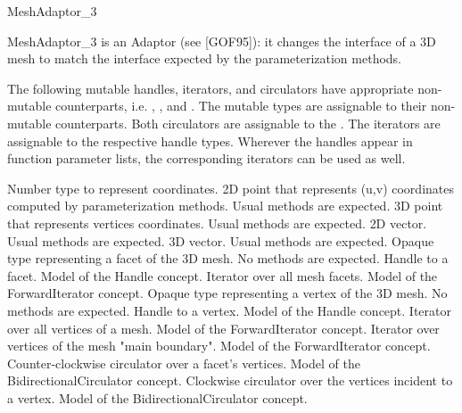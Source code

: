 \begin{ccRefConcept}{MeshAdaptor_3}

MeshAdaptor\_3 is an Adaptor (see [GOF95]): it changes the interface of a 3D mesh to match the interface expected by the parameterization methods.


\ccTypes

The following mutable handles, iterators, and circulators have appropriate
non-mutable counterparts, i.e. ,
, and . The mutable types are
assignable to their non-mutable counterparts.  Both circulators are
assignable to the . The iterators are
assignable to the respective handle types. Wherever the handles appear
in function parameter lists, the corresponding iterators can be used as
well.

{
Number type to represent coordinates.
}
{
2D point that represents (u,v) coordinates computed by parameterization methods. Usual methods are expected.
}
{
3D point that represents vertices coordinates. Usual methods are expected.
}
{
2D vector. Usual methods are expected.
}
{
3D vector. Usual methods are expected.
}
{
Opaque type representing a facet of the 3D mesh. No methods are expected.
}
{
Handle to a facet. Model of the Handle concept.
}
{
}
{
Iterator over all mesh facets. Model of the ForwardIterator concept.
}
{
}
{
Opaque type representing a vertex of the 3D mesh. No methods are expected.
}
{
Handle to a vertex. Model of the Handle concept.
}
{
}
{
Iterator over all vertices of a mesh. Model of the ForwardIterator concept.
}
{
}
{
Iterator over vertices of the mesh "main boundary". Model of the ForwardIterator concept.
}
{
}
{
Counter-clockwise circulator over a facet's vertices. Model of the BidirectionalCirculator concept.
}
{
}
{
Clockwise circulator over the vertices incident to a vertex. Model of the BidirectionalCirculator concept.
}
{
}



\end{ccRefConcept}

